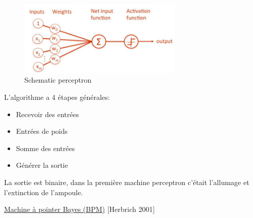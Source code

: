 \documentclass[12pt]{article}
\begin{document}
{%

\begin{figure}[H]
	\centering
    \includegraphics[width=0.7\textwidth]{image11.png}
     \caption{ Schematic perceptron}
    \label{fig:11}
\end{figure}


L'algorithme a 4 étapes générales:
\begin{itemize}
\item Recevoir des entrées
\item Entrées de poids
\item Somme des entrées
\item Générer la sortie
\end{itemize}

La sortie est binaire, dans la première machine perceptron c'était l'allumage et l'extinction de l'ampoule.


\underline{Machine à pointer Bayes (BPM)}  {\color{red}[Herbrich 2001]}

}
\end{document}
